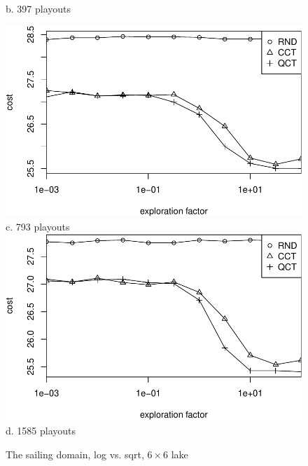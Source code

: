 \documentclass{article}
\begin{document}
\begin{figure}[ht]
\begin{minipage}[b]{0.5\linewidth}
    b. 397 playouts\\
  \end{minipage}
  \begin{minipage}[b]{0.5\linewidth}
    \centering
    \includegraphics[scale=0.45]{rcq-size=6-nsamples=793.pdf}\\
    c. 793 playouts\\
    \vspace{1em}
    \includegraphics[scale=0.45]{rcq-size=6-nsamples=1585.pdf}\\
    d. 1585 playouts\\
  \end{minipage}
  \caption{The sailing domain, log vs. sqrt, $6\times 6$ lake}
  \label{fig:sailing-rcq-vs-factor}
\end{figure}

\end{document}
